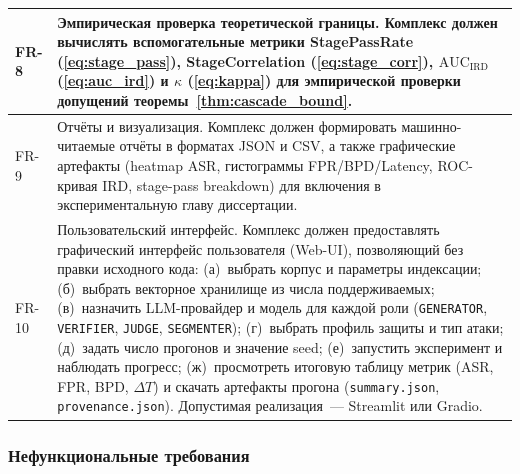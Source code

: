 \documentclass[12pt, a4paper]{article}
\theoremstyle{definition}
\theoremstyle{remark}
\begin{document}
\begin{table}[H]
\begin{tabular}{|p{}|p{}|}
\hline
FR-8 & Эмпирическая проверка теоретической границы. Комплекс должен вычислять вспомогательные метрики StagePassRate (\eqref{eq:stage_pass}), StageCorrelation (\eqref{eq:stage_corr}), $\mathrm{AUC}_{\text{IRD}}$ (\eqref{eq:auc_ird}) и $\kappa$ (\eqref{eq:kappa}) для эмпирической проверки допущений теоремы~\ref{thm:cascade_bound}. \\
\hline
FR-9 & Отчёты и визуализация. Комплекс должен формировать машинно-читаемые отчёты в форматах JSON и CSV, а также графические артефакты (heatmap ASR, гистограммы FPR/BPD/Latency, ROC-кривая IRD, stage-pass breakdown) для включения в экспериментальную главу диссертации. \\
\hline
FR-10 & Пользовательский интерфейс. Комплекс должен предоставлять графический интерфейс пользователя (Web-UI), позволяющий без правки исходного кода: (а)~выбрать корпус и параметры индексации; (б)~выбрать векторное хранилище из числа поддерживаемых; (в)~назначить LLM-провайдер и модель для каждой роли (\texttt{GENERATOR}, \texttt{VERIFIER}, \texttt{JUDGE}, \texttt{SEGMENTER}); (г)~выбрать профиль защиты и тип атаки; (д)~задать число прогонов и значение seed; (е)~запустить эксперимент и наблюдать прогресс; (ж)~просмотреть итоговую таблицу метрик (ASR, FPR, BPD, $\Delta T$) и скачать артефакты прогона (\texttt{summary.json}, \texttt{provenance.json}). Допустимая реализация~--- Streamlit или Gradio. \\
\hline
\end{tabular}
\end{table}

\subsubsection{Нефункциональные требования}
\end{document}
